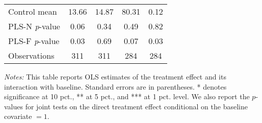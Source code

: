 \begin{table}[ht]
{\begin{threeparttable}
\begin{tabular}{l*{4}{c}}
Control mean    &    13.66         &    14.87         &    80.31         &     0.12         \\
PLS-N \emph{p}-value&     0.06         &     0.34         &     0.49         &     0.82         \\
PLS-F \emph{p}-value&     0.03         &     0.69         &     0.07         &     0.03         \\
Observations    &      311         &      311         &      284         &      284         \\
\bottomrule \end{tabular} \begin{tablenotes}[flushleft] \footnotesize \item \emph{Notes:} This table reports OLS estimates of the treatment effect and its interaction with baseline. Standard errors are in parentheses. * denotes significance at 10 pct., ** at 5 pct., and *** at 1 pct. level. We also report the \(p\)-values for joint tests on the direct treatment effect conditional on the baseline covariate $= 1$. \end{tablenotes} \end{threeparttable} } \end{table}

